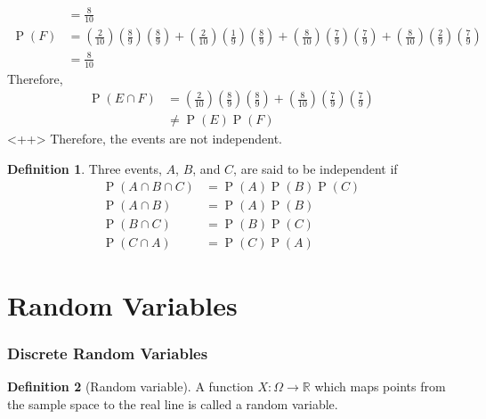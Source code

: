 \documentclass[titlepage, fleqn, a4paper, 12pt, twoside]{article}
\theoremstyle{definition}
\newtheorem{definition}{Definition}
\theoremstyle{theorem}
\DeclareMathOperator{\prob}{\mathrm{P}}
\begin{document}
\begin{solution}
\begin{align*}
                         & = \frac{8}{10}                                                                                                                                                                                                                                                                                                                                  \\
		\prob(F) & = \left( \frac{2}{10} \right) \left( \frac{8}{9} \right) \left( \frac{8}{9} \right) + \left( \frac{2}{10} \right) \left( \frac{1}{9} \right) \left( \frac{8}{9} \right) + \left( \frac{8}{10} \right) \left( \frac{7}{9} \right) \left( \frac{7}{9} \right) + \left( \frac{8}{10} \right) \left( \frac{2}{9} \right) \left( \frac{7}{9} \right) \\
                         & = \frac{8}{10}
	\end{align*}
	Therefore,
	\begin{align*}
		\prob(E \cap F) & = \left( \frac{2}{10} \right) \left( \frac{8}{9} \right) \left( \frac{8}{9} \right) + \left( \frac{8}{10} \right) \left( \frac{7}{9} \right) \left( \frac{7}{9} \right) \\
                                & \neq \prob(E) \prob(F)
	\end{align*}<++>
	Therefore, the events are not independent.
\end{solution}

\begin{definition}
	Three events, $A$, $B$, and $C$, are said to be independent if
	\begin{align*}
		\prob(A \cap B \cap C) & = \prob(A) \prob(B) \prob(C) \\
		\prob(A \cap B)        & = \prob(A) \prob(B)          \\
		\prob(B \cap C)        & = \prob(B) \prob(C)          \\
		\prob(C \cap A)        & = \prob(C) \prob(A)
	\end{align*}
\end{definition}

\clearpage
\part{Random Variables}

\section{Discrete Random Variables}

\begin{definition}[Random variable]
	A function $X : \Omega \to \mathbb{R}$ which maps points from the sample space to the real line is called a random variable.
\end{definition}
\end{document}
